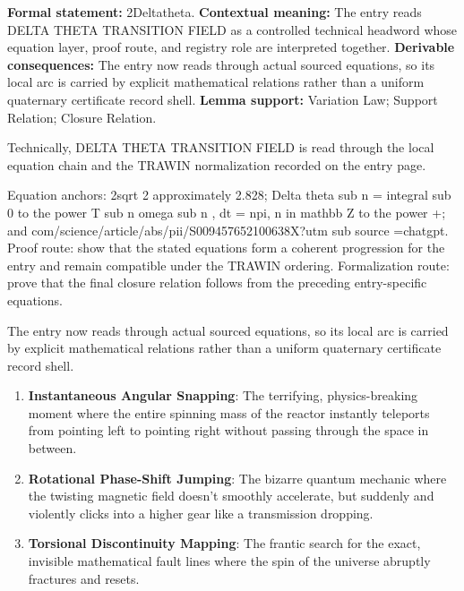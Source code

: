 \begingroup\footnotesize\setlength{\emergencystretch}{3em}\sloppy
\textbf{Formal statement:} 2Deltatheta. \textbf{Contextual meaning:} The entry reads DELTA THETA TRANSITION FIELD as a controlled technical headword whose equation layer, proof route, and registry role are interpreted together. \textbf{Derivable consequences:} The entry now reads through actual sourced equations, so its local arc is carried by explicit mathematical relations rather than a uniform quaternary certificate record shell. \textbf{Lemma support:} Variation Law; Support Relation; Closure Relation.\par
\endgroup

Technically, DELTA THETA TRANSITION FIELD is read through the local equation chain and the TRAWIN normalization recorded on the entry page.

Equation anchors: 2sqrt 2 approximately 2.828; Delta theta sub n = integral sub 0 to the power T sub n omega sub n , dt = npi, n in mathbb Z to the power +; and com/science/article/abs/pii/S009457652100638X?utm sub source =chatgpt. Proof route: show that the stated equations form a coherent progression for the entry and remain compatible under the TRAWIN ordering. Formalization route: prove that the final closure relation follows from the preceding entry-specific equations.

The entry now reads through actual sourced equations, so its local arc is carried by explicit mathematical relations rather than a uniform quaternary certificate record shell.
\endgroup

\begin{enumerate}[leftmargin=1.6em,itemsep=6pt,topsep=4pt]
\item \textbf{Instantaneous Angular Snapping}: The terrifying, physics-breaking moment where the entire spinning mass of the reactor instantly teleports from pointing left to pointing right without passing through the space in between.
\item \textbf{Rotational Phase-Shift Jumping}: The bizarre quantum mechanic where the twisting magnetic field doesn't smoothly accelerate, but suddenly and violently clicks into a higher gear like a transmission dropping.
\item \textbf{Torsional Discontinuity Mapping}: The frantic search for the exact, invisible mathematical fault lines where the spin of the universe abruptly fractures and resets.
\end{enumerate}

